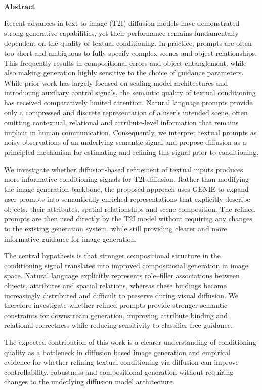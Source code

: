 \documentclass[a4paper,twoside,12pt]{report}
\renewenvironment{abstract}{\ \vfill\begin{center}\textbf{Abstract}\end{center}\addcontentsline{toc}{section}{Abstract}}{\vfill\vfill\newpage}
\begin{document}
\begin{abstract}
Recent advances in text-to-image (T2I) diffusion models have demonstrated strong generative capabilities, yet their performance remains fundamentally dependent on the quality of textual conditioning. In practice, prompts are often too short and ambiguous to fully specify complex scenes and object relationships. This frequently results in compositional errors and object entanglement, while also making generation highly sensitive to the choice of guidance parameters. While prior work has largely focused on scaling model architectures and introducing auxiliary control signals, the semantic quality of textual conditioning has received comparatively limited attention. Natural language prompts provide only a compressed and discrete representation of a user’s intended scene, often omitting contextual, relational and attribute-level information that remains implicit in human communication. Consequently, we interpret textual prompts as noisy observations of an underlying semantic signal and propose diffusion as a principled mechanism for estimating and refining this signal prior to conditioning.

We investigate whether diffusion-based refinement of textual inputs produces more informative conditioning signals for T2I diffusion. Rather than modifying the image generation backbone, the proposed approach uses GENIE to expand user prompts into semantically enriched representations that explicitly describe objects, their attributes, spatial relationships and scene composition. The refined prompts are then used directly by the T2I model without requiring any changes to the existing generation system, while still providing clearer and more informative guidance for image generation.

The central hypothesis is that stronger compositional structure in the conditioning signal translates into improved compositional generation in image space. Natural language explicitly represents role–filler associations between objects, attributes and spatial relations, whereas these bindings become increasingly distributed and difficult to preserve during visual diffusion. We therefore investigate whether refined prompts provide stronger semantic constraints for downstream generation, improving attribute binding and relational correctness while reducing sensitivity to classifier-free guidance.

The expected contribution of this work is a clearer understanding of conditioning quality as a bottleneck in diffusion based image generation and empirical evidence for whether refining textual conditioning via diffusion can improve controllability, robustness and compositional generation without requiring changes to the underlying diffusion model architecture.
\end{abstract}
\end{document}

